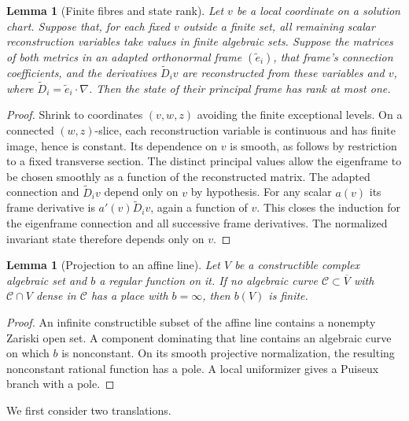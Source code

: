 \documentclass[11pt,a4paper]{article}
\numberwithin{equation}{section}
\theoremstyle{plain}
\newtheorem{lemma}[theorem]{Lemma}
\theoremstyle{definition}
\theoremstyle{remark}
\begin{document}
\begin{lemma}[Finite fibres and state rank]\label{iso:finite-fibres}
Let $v$ be a local coordinate on a solution chart.  Suppose that, for
each fixed $v$ outside a finite set, all remaining scalar reconstruction
variables take values in finite algebraic sets.  Suppose the matrices
of both metrics in an adapted orthonormal frame $(\widetilde e_i)$, that frame's
connection coefficients, and the derivatives $\widetilde D_i v$ are reconstructed
from these variables and $v$, where $\widetilde D_i=\widetilde e_i\cdot\nabla$.
Then the state of their principal frame has rank at most one.
\end{lemma}
\begin{proof}
Shrink to coordinates $(v,w,z)$ avoiding the finite exceptional levels.
On a connected $(w,z)$-slice, each reconstruction variable is continuous
and has finite image, hence is constant.  Its dependence on $v$ is smooth,
as follows by restriction to a fixed transverse section.  
The distinct principal values allow the eigenframe to be chosen smoothly as a
function of the reconstructed matrix.  The adapted connection and $\widetilde D_i v$
depend only on $v$ by hypothesis.  For any scalar $a(v)$ its frame derivative
is $a'(v)\widetilde D_i v$, again a function of $v$.  This closes the induction for the
eigenframe connection and all successive frame derivatives.  The normalized
invariant state therefore depends only on $v$.
\end{proof}

\begin{lemma}[Projection to an affine line]\label{iso:algebraic-fibres}
Let $V$ be a constructible complex algebraic set and $b$ a regular function
on it.  If no algebraic curve $\mathscr C\subset\overline V$ with $\mathscr C\cap V$ dense
in $\mathscr C$ has a place with $b=\infty$, then $b(V)$ is finite.
\end{lemma}
\begin{proof}
An infinite constructible subset of the affine line contains a nonempty
Zariski open set.  A component dominating that line contains an algebraic
curve on which $b$ is nonconstant.  On its smooth projective normalization,
the resulting nonconstant rational function has a pole.  A local
uniformizer gives a Puiseux branch with a pole.  
\end{proof}

We first consider two translations.
\end{document}
